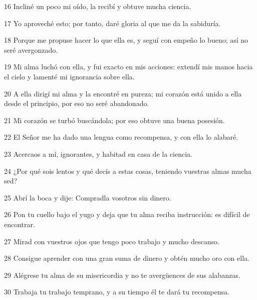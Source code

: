 \par 16 Incliné un poco mi oído, la recibí y obtuve mucha ciencia.
\par 17 Yo aproveché esto; por tanto, daré gloria al que me da la sabiduría.
\par 18 Porque me propuse hacer lo que ella es, y seguí con empeño lo bueno; así no seré avergonzado.
\par 19 Mi alma luchó con ella, y fui exacto en mis acciones: extendí mis manos hacia el cielo y lamenté mi ignorancia sobre ella.
\par 20 A ella dirigí mi alma y la encontré en pureza; mi corazón está unido a ella desde el principio, por eso no seré abandonado.
\par 21 Mi corazón se turbó buscándola; por eso obtuve una buena posesión.
\par 22 El Señor me ha dado una lengua como recompensa, y con ella lo alabaré.
\par 23 Acercaos a mí, ignorantes, y habitad en casa de la ciencia.
\par 24 ¿Por qué sois lentos y qué decís a estas cosas, teniendo vuestras almas mucha sed?
\par 25 Abrí la boca y dije: Compradla vosotros sin dinero.
\par 26 Pon tu cuello bajo el yugo y deja que tu alma reciba instrucción: es difícil de encontrar.
\par 27 Mirad con vuestros ojos que tengo poco trabajo y mucho descanso.
\par 28 Consigue aprender con una gran suma de dinero y obtén mucho oro con ella.
\par 29 Alégrese tu alma de su misericordia y no te avergüences de sus alabanzas.
\par 30 Trabaja tu trabajo temprano, y a su tiempo él te dará tu recompensa.


